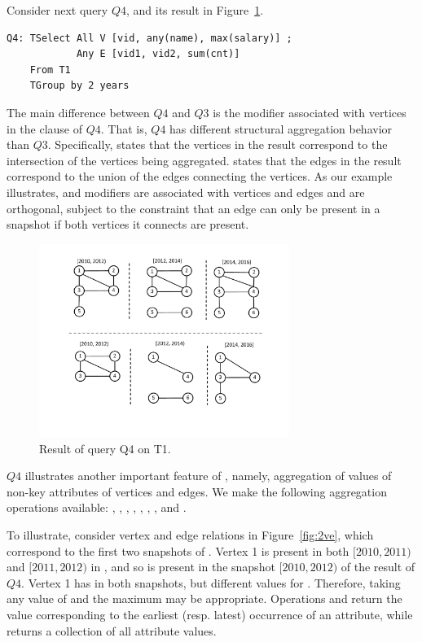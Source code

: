 Consider next query $Q4$, and its result in
Figure~\ref{fig:tg_all_any}.

\begin{verbatim}
Q4: TSelect All V [vid, any(name), max(salary)] ; 
            Any E [vid1, vid2, sum(cnt)] 
    From T1 
    TGroup by 2 years
\end{verbatim}

The main difference between $Q4$ and $Q3$ is the  modifier
associated with vertices in the  clause of $Q4$.  That
is, $Q4$ has different structural aggregation behavior than $Q3$.
Specifically,  states that the vertices in the result
correspond to the intersection of the vertices being aggregated.
 states that the edges in the result correspond to the
union of the edges connecting the vertices.  As our example
illustrates,  and  modifiers are associated with
vertices and edges and are orthogonal, subject to the constraint that
an edge can only be present in a snapshot if both vertices it connects
are present.

\begin{figure}
\includegraphics[width=3.2in]{figs/TGroupAllAny.pdf}
\caption{Result of query Q4 on T1.}
\label{fig:tg_all_any}
\end{figure}

$Q4$ illustrates another important feature of \ql, namely, aggregation
of values of non-key attributes of vertices and edges.  We make the
following aggregation operations available: ,
, , , , ,
, and .

To illustrate, consider vertex and edge relations in
Figure~\ref{fig:2ve}, which correspond to the first two snapshots of
.  Vertex 1 is present in both $[2010, 2011)$ and $[2011,
    2012)$ in , and so is present in the snapshot $[2010,
      2012)$ of the result of $Q4$.  Vertex 1 has 
      in both snapshots, but different values for .
      Therefore, taking any value of  and the maximum
       may be appropriate.  Operations  and
       return the value corresponding to the earliest
      (resp. latest) occurrence of an attribute, while 
      returns a collection of all attribute values.

